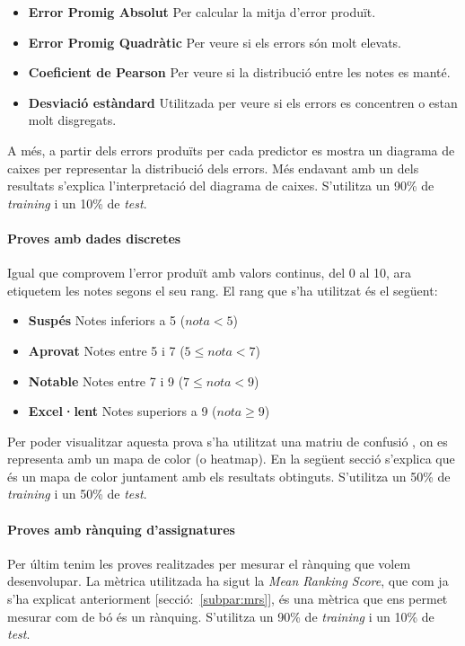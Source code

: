 \documentclass[12pt,a4paper,catalan]{article}
\begin{document}
\begin{itemize}[leftmargin=.5in]
	\item \textbf{Error Promig Absolut} Per calcular la mitja d'error produït.
	\item \textbf{Error Promig Quadràtic} Per veure si els errors són molt elevats.
	\item \textbf{Coeficient de Pearson} Per veure si la distribució entre les notes es manté.
	\item \textbf{Desviació estàndard} Utilitzada per veure si els errors es concentren o estan molt disgregats.
\end{itemize}

A més, a partir dels errors produïts per cada predictor es mostra un diagrama de caixes \cite{boxplot} per representar la distribució dels errors. Més endavant amb un dels resultats s'explica l'interpretació del diagrama de caixes. S'utilitza un 90\% de \textit{training} i un 10\% de \textit{test}.


\paragraph{Proves amb dades discretes}
Igual que comprovem l'error produït amb valors continus, del 0 al 10, ara etiquetem les notes segons el seu rang. El rang que s'ha utilitzat és el següent:

\begin{itemize}[leftmargin=.5in]
	\item \textbf{Suspés} Notes inferiors a 5 ($nota < 5$)
	\item \textbf{Aprovat} Notes entre 5 i 7 ($5 \leq nota < 7 $)
	\item \textbf{Notable} Notes entre 7 i 9 ($7 \leq nota < 9 $)
	\item \textbf{Excel·lent} Notes superiors a 9 ($nota \geq 9$)
\end{itemize}

Per poder visualitzar aquesta prova s'ha utilitzat una matriu de confusió \cite{confusionmatrix}, on es representa amb un mapa de color (o heatmap). En la següent secció s'explica que és un mapa de color juntament amb els resultats obtinguts. S'utilitza un 50\% de \textit{training} i un 50\% de \textit{test}.

\paragraph{Proves amb rànquing d'assignatures}
Per últim tenim les proves realitzades per mesurar el rànquing que volem desenvolupar. La mètrica utilitzada ha sigut la \textit{Mean Ranking Score}, que com ja s'ha explicat anteriorment [secció:~\ref{subpar:mrs}], és una mètrica que ens permet mesurar com de bó és un rànquing. S'utilitza un 90\% de \textit{training} i un 10\% de \textit{test}.
\end{document}
